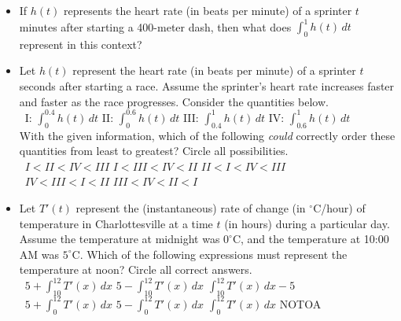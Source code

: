 \documentclass[11pt]{article}
\begin{document}
\begin{enumerate}
\begin{itemize}
    \item[(b)] If $h(t)$ represents the heart rate (in beats per minute) of a sprinter $t$ minutes after starting a 400-meter dash, then what does $\displaystyle\int_0^{1} h(t)\,dt$ represent in this context?
    \vfill

    \item[(c)] Let $h(t)$ represent the heart rate (in beats per minute) of a sprinter $t$ seconds after starting a race. Assume the sprinter's heart rate increases faster and faster as the race progresses. Consider the quantities below.\\[0.2in]
    \,\hfill
    I: $\displaystyle\int_{0}^{0.4} h(t)\,dt$
    \hfill
    II: $\displaystyle\int_{0}^{0.6} h(t)\,dt$
    \hfill
    III: $\displaystyle\int_{0.4}^{1} h(t)\,dt$
    \hfill
    IV: $\displaystyle\int_{0.6}^{1} h(t)\,dt$
    \hfill\,\\

    With the given information, which of the following {\it could} correctly order these quantities from least to greatest? Circle all possibilities.\\[0.2in]
    \,\hfill
     $I<II<IV<III$
    \hfill
     $I<III<IV<II$
    \hfill
     $II<I<IV<III$
    \hfill\,\\
    
    \,\hfill
     $IV<III<I<II$
    \hfill
     $III<IV<II<I$
    \hfill\,\\

    \item[(d)] Let $T'(t)$ represent the (instantaneous) rate of change (in $^{\circ}$C/hour) of temperature in Charlottesville at a time $t$ (in hours) during a particular day. Assume the temperature at midnight was $0^{\circ}$C, and the temperature at 10:00 AM was $5^{\circ}$C. Which of the following expressions must represent the temperature at noon? Circle all correct answers.\\[0.2in]
    \,\hfill
     $5+\displaystyle\int_{10}^{12} T'(x)\,dx$
    \hfill
     $5-\displaystyle\int_{10}^{12} T'(x)\,dx$
    \hfill
     $\displaystyle\int_{10}^{12} T'(x)\,dx-5$
    \hfill\,\\
    
    \,\hfill
     $5+\displaystyle\int_0^{12} T'(x)\,dx$
    \hfill
     $5-\displaystyle\int_0^{12} T'(x)\,dx$
    \hfill
     $\displaystyle\int_0^{12} T'(x)\,dx$
    \hfill
     NOTOA
    \hfill\,\\
    \end{itemize}
\newpage



\end{enumerate}
\end{document}
